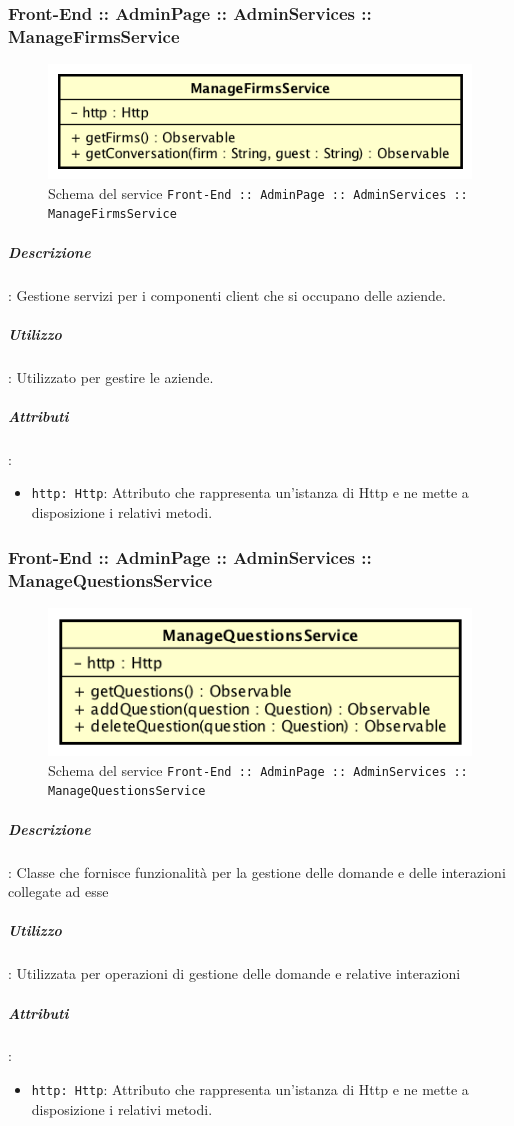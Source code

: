 \documentclass[../ManualeSviluppatore_v2.0.0.tex]{subfiles}
\begin{document}
		      	\subsubsection{Front-End :: AdminPage :: AdminServices :: ManageFirmsService}
				\begin{figure}[!h]
					\centering
					\includegraphics[scale=0.6]{Architettura/Front-End/AdminPage/AdminServices/ManageFirmsService.png}
					\caption{Schema del service \texttt{Front-End :: AdminPage :: AdminServices :: ManageFirmsService}}
				\end{figure}
			      	\subparagraph{Descrizione}: Gestione servizi per i componenti client che si occupano delle aziende.
			      	\subparagraph{Utilizzo}: Utilizzato per gestire le aziende.
			      	\subparagraph{Attributi}:
      	      		\begin{itemize}
						\item \texttt{http: Http}: Attributo che rappresenta un'istanza di Http e ne mette a disposizione i relativi metodi.
	      	      	\end{itemize}
\newpage
				\subsubsection{Front-End :: AdminPage :: AdminServices :: ManageQuestionsService}
				\begin{figure}[!h]
					\centering
					\includegraphics[scale=0.6]{Architettura/Front-End/AdminPage/AdminServices/ManageQuestionsService.png}
					\caption{Schema del service \texttt{Front-End :: AdminPage :: AdminServices :: ManageQuestionsService}}
				\end{figure}

					\subparagraph{Descrizione}: Classe che fornisce funzionalità per la gestione delle domande e delle interazioni collegate ad esse
					\subparagraph{Utilizzo}: Utilizzata per operazioni di gestione delle domande e relative interazioni
					\subparagraph{Attributi}:
			      	\begin{itemize}
						\item \texttt{http: Http}: Attributo che rappresenta un'istanza di Http e ne mette a disposizione i relativi metodi.
			      	\end{itemize}
\newpage
\end{document}
